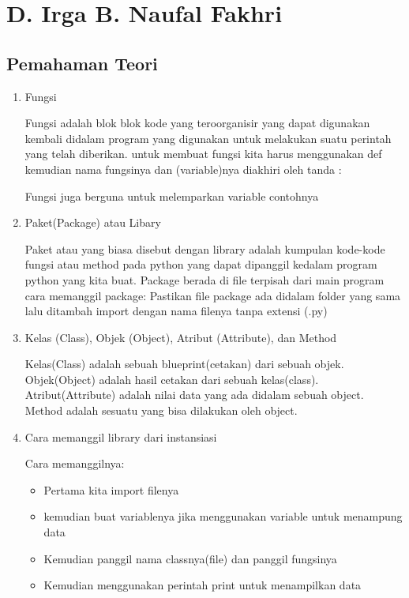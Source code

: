 \section{D. Irga B. Naufal Fakhri}
\subsection{Pemahaman Teori}
\begin{enumerate}
\item Fungsi

Fungsi adalah blok blok kode yang teroorganisir yang dapat digunakan kembali didalam program yang digunakan untuk melakukan suatu perintah yang telah diberikan.
untuk membuat fungsi kita harus menggunakan def kemudian nama fungsinya dan (variable)nya diakhiri oleh tanda :

Fungsi juga berguna untuk melemparkan variable contohnya


\item Paket(Package) atau Libary

Paket atau yang biasa disebut dengan library adalah kumpulan kode-kode fungsi atau method pada python yang dapat dipanggil kedalam program python yang kita buat. Package berada di file terpisah dari main program
cara memanggil package: Pastikan file package ada didalam folder yang sama lalu ditambah import dengan nama filenya tanpa extensi (.py)


\item Kelas (Class), Objek (Object), Atribut (Attribute), dan Method

Kelas(Class) adalah sebuah blueprint(cetakan) dari sebuah objek.
Objek(Object) adalah hasil cetakan dari sebuah kelas(class).
Atribut(Attribute) adalah nilai data yang ada didalam sebuah object.
Method adalah sesuatu yang bisa dilakukan oleh object.



\item Cara memanggil library dari instansiasi

Cara memanggilnya:
\begin{itemize}
	\item Pertama kita import filenya
	\item kemudian buat variablenya jika menggunakan variable untuk menampung data
	\item Kemudian panggil nama classnya(file) dan panggil fungsinya
	\item Kemudian menggunakan perintah print untuk menampilkan data
\end{itemize}
 



\end{enumerate}
